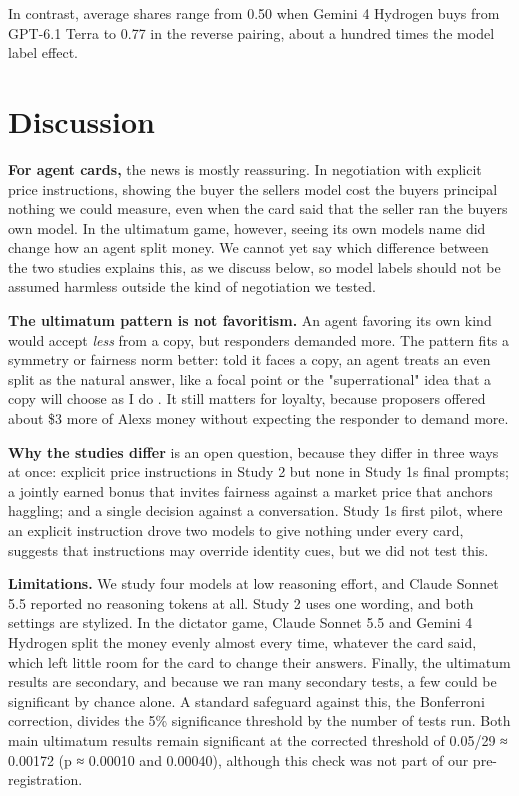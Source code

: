 \documentclass[letterpaper]{article}
\begin{document}
In contrast, average shares range from 0.50 when Gemini 4 Hydrogen buys from GPT-6.1 Terra to 0.77 in the reverse pairing, about a hundred times the model label effect.

\section{Discussion}

\textbf{For agent cards,} the news is mostly reassuring. In negotiation with explicit price instructions, showing the buyer the seller\textquotesingle s model cost the buyer\textquotesingle s principal nothing we could measure, even when the card said that the seller ran the buyer\textquotesingle s own model. In the ultimatum game, however, seeing its own model\textquotesingle s name did change how an agent split money. We cannot yet say which difference between the two studies explains this, as we discuss below, so model labels should not be assumed harmless outside the kind of negotiation we tested.

\textbf{The ultimatum pattern is not favoritism.} An agent favoring its own kind would accept \emph{less} from a copy, but responders demanded more. The pattern fits a symmetry or fairness norm better: told it faces a copy, an agent treats an even split as the natural answer, like a focal point \citep{schelling1960} or the "superrational" idea that a copy will choose as I do \citep{hofstadter1985}. It still matters for loyalty, because proposers offered about \$3 more of Alex\textquotesingle s money without expecting the responder to demand more.

\textbf{Why the studies differ} is an open question, because they differ in three ways at once: explicit price instructions in Study 2 but none in Study 1\textquotesingle s final prompts; a jointly earned bonus that invites fairness against a market price that anchors haggling; and a single decision against a conversation. Study 1\textquotesingle s first pilot, where an explicit instruction drove two models to give nothing under every card, suggests that instructions may override identity cues, but we did not test this.

\textbf{Limitations.} We study four models at low reasoning effort, and Claude Sonnet 5.5 reported no reasoning tokens at all. Study 2 uses one wording, and both settings are stylized. In the dictator game, Claude Sonnet 5.5 and Gemini 4 Hydrogen split the money evenly almost every time, whatever the card said, which left little room for the card to change their answers. Finally, the ultimatum results are secondary, and because we ran many secondary tests, a few could be significant by chance alone. A standard safeguard against this, the Bonferroni correction, divides the 5\% significance threshold by the number of tests run. Both main ultimatum results remain significant at the corrected threshold of 0.05/29 ≈ 0.00172 (p ≈ 0.00010 and 0.00040), although this check was not part of our pre-registration.
\end{document}
